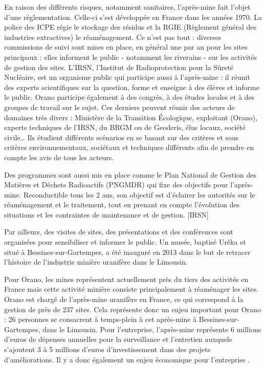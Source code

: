 \documentclass{article}
\begin{document}
En raison des différents risques, notamment sanitaires, l’après-mine fait l’objet d’une réglementation. Celle-ci s’est développée en France dans les années 1970.
 La police des ICPE régie le stockage des résidus et la RGIE (Règlement général des industries extractives) le réaménagement. Ce n’est pas tout : diverses commissions de suivi sont mises en place, en général une par an pour les sites principaux : elles informent le public - notamment les riverains - sur les activités de gestion des sites.
L’IRSN, l’Institut de Radioprotection pour la Sûreté Nucléaire, est un organisme public qui participe aussi à l’après-mine : il réunit des experts scientifiques sur la question, forme et enseigne à des élèves et informe le public. Orano participe également à des congrès, à des études locales et à des groupes de travail sur le sujet. Ces derniers peuvent réunir des acteurs de domaines très divers : Ministère de la Transition Écologique, exploitant (Orano), experts techniques de l’IRSN, du BRGM ou de Geoderis, élus locaux, société civile… Ils étudient différents scénarios en se basant sur des critères et sous critères environnementaux, sociétaux et techniques différents afin de prendre en compte les avis de tous les acteurs.

Des programmes sont aussi mis en place comme le Plan National de Gestion des Matières et Déchets Radioactifs (PNGMDR) qui fixe des objectifs pour l’après-mine. Reconductible tous les  2 ans, son objectif est d’éclairer les autorités sur le réaménagement et le traitement, tout en prenant en compte l’évolution des situations et les contraintes de maintenance et de gestion.  [IRSN]

Par ailleurs, des visites de sites, des présentations et des conférences sont organisées pour sensibiliser et informer le public. Un musée, baptisé Urêka et situé à Bessines-sur-Gartempes, a été inauguré en 2013 dans le but de retracer l’histoire de l’industrie minière uranifère dans le Limousin.

Pour Orano, les mines représentent actuellement près du tiers des activités en France mais cette activité minière consiste principalement à réaménager les sites. Orano est chargé de l’après-mine uranifère en France, ce qui correspond à la gestion de près de 237 sites. Cela représente donc un enjeu important pour Orano : 26 personnes se consacrent à temps-plein à cet après-mine à Bessines-sur-Gartempes, dans le Limousin. Pour l’entreprise, l’après-mine représente 6 millions d’euros de dépenses annuelles pour la surveillance et l’entretien auxquels s’ajoutent 3 à 5 millions d’euros d’investissement dans des projets d’améliorations. Il y a donc également un enjeu économique pour l’entreprise \cite{himeur_apres-mine_2020}. 
\end{document}
